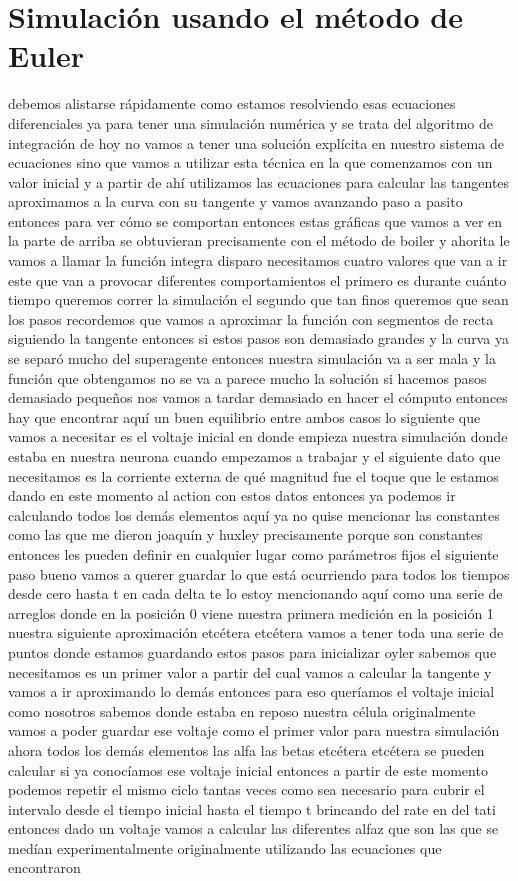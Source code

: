 \section{Simulación usando el método de Euler}
debemos alistarse rápidamente como estamos resolviendo esas ecuaciones diferenciales ya para tener una simulación numérica y se trata del algoritmo de integración de hoy no vamos a tener una solución explícita en nuestro sistema de ecuaciones sino que vamos a utilizar esta técnica en la que comenzamos con un valor inicial y a partir de ahí utilizamos las ecuaciones para calcular las tangentes aproximamos a la curva con su tangente y vamos avanzando paso a pasito entonces para ver cómo se comportan entonces estas gráficas que vamos a ver en la parte de arriba se obtuvieran precisamente con el método de boiler y ahorita le vamos a llamar la función integra disparo necesitamos cuatro valores que van a ir este que van a provocar diferentes comportamientos el primero es durante cuánto tiempo queremos correr la simulación el segundo que tan finos queremos que sean los pasos recordemos que vamos a aproximar la función con segmentos de recta siguiendo la tangente entonces si estos pasos son demasiado grandes y la curva ya se separó mucho del superagente entonces nuestra simulación va a ser mala y la función que obtengamos no se va a parece mucho la solución si hacemos pasos demasiado pequeños nos vamos a tardar demasiado en hacer el cómputo entonces hay que encontrar aquí un buen equilibrio entre ambos casos lo siguiente que vamos a necesitar es el voltaje inicial en donde empieza nuestra simulación donde estaba en nuestra neurona cuando empezamos a trabajar y el siguiente dato que necesitamos es la corriente externa de qué magnitud fue el toque que le estamos dando en este momento al action con estos datos entonces ya podemos ir calculando todos los demás elementos aquí ya no quise mencionar las constantes como las que me dieron joaquín y huxley precisamente porque son constantes entonces les pueden definir en cualquier lugar como parámetros fijos el siguiente paso bueno vamos a querer guardar lo que está ocurriendo para todos los tiempos desde cero hasta t en cada delta te lo estoy mencionando aquí como una serie de arreglos donde en la posición 0 viene nuestra primera medición en la posición 1 nuestra siguiente aproximación etcétera etcétera vamos a tener toda una serie de puntos donde estamos guardando estos pasos para inicializar oyler sabemos que necesitamos es un primer valor a partir del cual vamos a calcular la tangente y vamos a ir aproximando lo demás entonces para eso queríamos el voltaje inicial como nosotros sabemos donde estaba en reposo nuestra célula originalmente vamos a poder guardar ese voltaje como el primer valor para nuestra simulación ahora todos los demás elementos las alfa las betas etcétera etcétera se pueden calcular si ya conocíamos ese voltaje inicial entonces a partir de este momento podemos repetir el mismo ciclo tantas veces como sea necesario para cubrir el intervalo desde el tiempo inicial hasta el tiempo t brincando del rate en del tati entonces dado un voltaje vamos a calcular las diferentes alfaz que son las que se medían experimentalmente originalmente utilizando las ecuaciones que encontraron 